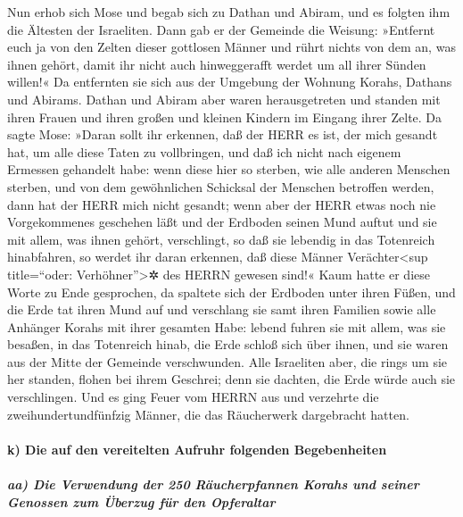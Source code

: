 Nun erhob sich Mose und begab sich zu Dathan und Abiram,
und es folgten ihm die Ältesten der Israeliten. Dann gab
er der Gemeinde die Weisung: »Entfernt euch ja von den Zelten dieser
gottlosen Männer und rührt nichts von dem an, was ihnen gehört, damit
ihr nicht auch hinweggerafft werdet um all ihrer Sünden willen!«
Da entfernten sie sich aus der Umgebung der Wohnung
Korahs, Dathans und Abirams. Dathan und Abiram aber waren herausgetreten
und standen mit ihren Frauen und ihren großen und kleinen Kindern im
Eingang ihrer Zelte. Da sagte Mose: »Daran sollt ihr
erkennen, daß der HERR es ist, der mich gesandt hat, um alle diese Taten
zu vollbringen, und daß ich nicht nach eigenem Ermessen gehandelt habe:
wenn diese hier so sterben, wie alle anderen Menschen
sterben, und von dem gewöhnlichen Schicksal der Menschen betroffen
werden, dann hat der HERR mich nicht gesandt; wenn aber
der HERR etwas noch nie Vorgekommenes geschehen läßt und der Erdboden
seinen Mund auftut und sie mit allem, was ihnen gehört, verschlingt, so
daß sie lebendig in das Totenreich hinabfahren, so werdet ihr daran
erkennen, daß diese Männer Verächter\textless sup title=``oder:
Verhöhner''\textgreater✲ des HERRN gewesen sind!« Kaum
hatte er diese Worte zu Ende gesprochen, da spaltete sich der Erdboden
unter ihren Füßen, und die Erde tat ihren Mund auf und
verschlang sie samt ihren Familien sowie alle Anhänger Korahs mit ihrer
gesamten Habe: lebend fuhren sie mit allem, was sie
besaßen, in das Totenreich hinab, die Erde schloß sich über ihnen, und
sie waren aus der Mitte der Gemeinde verschwunden. Alle
Israeliten aber, die rings um sie her standen, flohen bei ihrem
Geschrei; denn sie dachten, die Erde würde auch sie verschlingen.
Und es ging Feuer vom HERRN aus und verzehrte die
zweihundertundfünfzig Männer, die das Räucherwerk dargebracht hatten.

\hypertarget{k-die-auf-den-vereitelten-aufruhr-folgenden-begebenheiten}{%
\paragraph{k) Die auf den vereitelten Aufruhr folgenden
Begebenheiten}\label{k-die-auf-den-vereitelten-aufruhr-folgenden-begebenheiten}}

\hypertarget{aa-die-verwendung-der-250-ruxe4ucherpfannen-korahs-und-seiner-genossen-zum-uxfcberzug-fuxfcr-den-opferaltar}{%
\subparagraph{aa) Die Verwendung der 250 Räucherpfannen Korahs und
seiner Genossen zum Überzug für den
Opferaltar}\label{aa-die-verwendung-der-250-ruxe4ucherpfannen-korahs-und-seiner-genossen-zum-uxfcberzug-fuxfcr-den-opferaltar}}

